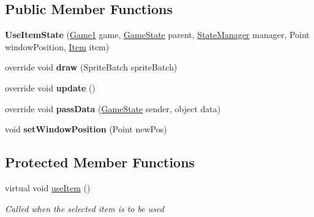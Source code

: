 \subsection*{Public Member Functions}
\begin{DoxyCompactItemize}
\item 
\hypertarget{class_simple_r_p_g_1_1_states_1_1_use_item_state_a11bf3becbf4d48248e00d04c6d44d467}{{\bfseries Use\-Item\-State} (\hyperlink{class_simple_r_p_g_1_1_game1}{Game1} game, \hyperlink{class_simple_r_p_g_1_1_states_1_1_game_state}{Game\-State} parent, \hyperlink{class_simple_r_p_g_1_1_states_1_1_state_manager}{State\-Manager} manager, Point window\-Position, \hyperlink{class_simple_r_p_g_1_1_items_1_1_item}{Item} item)}\label{class_simple_r_p_g_1_1_states_1_1_use_item_state_a11bf3becbf4d48248e00d04c6d44d467}

\item 
\hypertarget{class_simple_r_p_g_1_1_states_1_1_use_item_state_a5d99e92a08bc1407c045e1e5ab37f8b6}{override void {\bfseries draw} (Sprite\-Batch sprite\-Batch)}\label{class_simple_r_p_g_1_1_states_1_1_use_item_state_a5d99e92a08bc1407c045e1e5ab37f8b6}

\item 
\hypertarget{class_simple_r_p_g_1_1_states_1_1_use_item_state_ad385afabb54275c9163ae4a9f69c8145}{override void {\bfseries update} ()}\label{class_simple_r_p_g_1_1_states_1_1_use_item_state_ad385afabb54275c9163ae4a9f69c8145}

\item 
\hypertarget{class_simple_r_p_g_1_1_states_1_1_use_item_state_ae999153e8804e12bb0f9b9234730e498}{override void {\bfseries pass\-Data} (\hyperlink{class_simple_r_p_g_1_1_states_1_1_game_state}{Game\-State} sender, object data)}\label{class_simple_r_p_g_1_1_states_1_1_use_item_state_ae999153e8804e12bb0f9b9234730e498}

\item 
\hypertarget{class_simple_r_p_g_1_1_states_1_1_use_item_state_a8534195016da045a609c6ac0c0285adf}{void {\bfseries set\-Window\-Position} (Point new\-Pos)}\label{class_simple_r_p_g_1_1_states_1_1_use_item_state_a8534195016da045a609c6ac0c0285adf}

\end{DoxyCompactItemize}
\subsection*{Protected Member Functions}
\begin{DoxyCompactItemize}
\item 
virtual void \hyperlink{class_simple_r_p_g_1_1_states_1_1_use_item_state_a1b5489d92cced85b8185d1b98ad06363}{use\-Item} ()
\begin{DoxyCompactList}\small\item\em Called when the selected item is to be used \end{DoxyCompactList}\end{DoxyCompactItemize}

